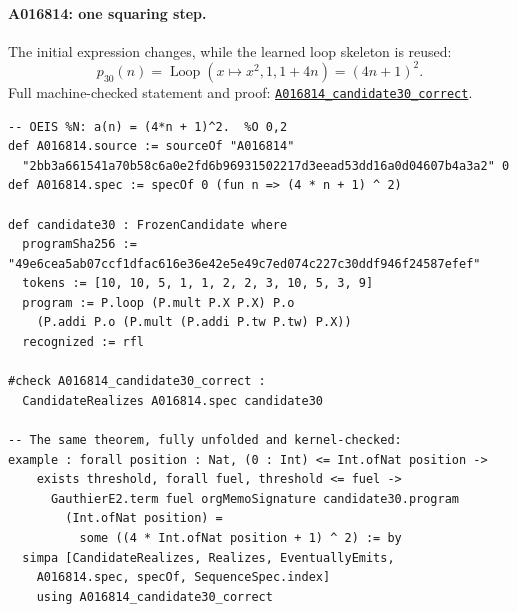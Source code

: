 \documentclass[11pt]{article}
\newcommand{\formalcommit}{f3a31db36bb2f944312ee31c1d86c2758109e83a}
\newcommand{\formalblob}{https://github.com/zariuq/MeTTapedia/blob/\formalcommit/lean/mettapedia/Mettapedia}
\newcommand{\leansource}[3]{%
  \href{\formalblob/#1\#L#2}{\nolinkurl{#3}}}
\begin{document}
\paragraph{A016814: one squaring step.}
The initial expression changes, while the learned loop skeleton is reused:
\[
p_{30}(n)=\operatorname{Loop}(x\mapsto x^2,1,1+4n)=(4n+1)^2.
\]
\noindent Full machine-checked statement and proof:
\leansource{GSLT/LanguageDef/Gauthier/Adjudications33.lean}{282-L297}{A016814_candidate30_correct}.
\begin{lstlisting}[caption={A016814, discovered exclusively by the belief-register arm
through derived retention in world 2, generation 1. The proof replaces a 44-term match
with a full-domain theorem.}]
-- OEIS %N: a(n) = (4*n + 1)^2.  %O 0,2
def A016814.source := sourceOf "A016814"
  "2bb3a661541a70b58c6a0e2fd6b96931502217d3eead53dd16a0d04607b4a3a2" 0
def A016814.spec := specOf 0 (fun n => (4 * n + 1) ^ 2)

def candidate30 : FrozenCandidate where
  programSha256 := "49e6cea5ab07ccf1dfac616e36e42e5e49c7ed074c227c30ddf946f24587efef"
  tokens := [10, 10, 5, 1, 1, 2, 2, 3, 10, 5, 3, 9]
  program := P.loop (P.mult P.X P.X) P.o
    (P.addi P.o (P.mult (P.addi P.tw P.tw) P.X))
  recognized := rfl

#check A016814_candidate30_correct :
  CandidateRealizes A016814.spec candidate30

-- The same theorem, fully unfolded and kernel-checked:
example : forall position : Nat, (0 : Int) <= Int.ofNat position ->
    exists threshold, forall fuel, threshold <= fuel ->
      GauthierE2.term fuel orgMemoSignature candidate30.program
        (Int.ofNat position) =
          some ((4 * Int.ofNat position + 1) ^ 2) := by
  simpa [CandidateRealizes, Realizes, EventuallyEmits,
    A016814.spec, specOf, SequenceSpec.index]
    using A016814_candidate30_correct
\end{lstlisting}

\end{document}
